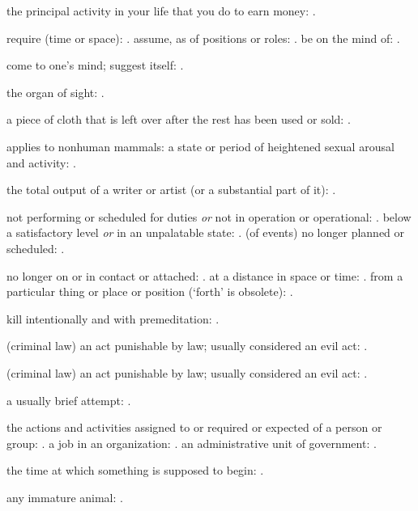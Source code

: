   the principal activity in your life that you do to earn money: .

  require (time or space): . assume, as of positions or roles: . be on the mind of: .

  come to one's mind; suggest itself: .

  the organ of sight: .

  a piece of cloth that is left over after the rest has been used or sold: .

  applies to nonhuman mammals: a state or period of heightened sexual arousal and activity: .

  the total output of a writer or artist (or a substantial part of it): .

  not performing or scheduled for duties \textit{or} not in operation or operational: . below a satisfactory level \textit{or} in an unpalatable state: . (of events) no longer planned or scheduled: .

  no longer on or in contact or attached: . at a distance in space or time: . from a particular thing or place or position (`forth' is obsolete): .

  kill intentionally and with premeditation: .

  (criminal law) an act punishable by law; usually considered an evil act: .

  (criminal law) an act punishable by law; usually considered an evil act: .

  a usually brief attempt: .

  the actions and activities assigned to or required or expected of a person or group: . a job in an organization: . an administrative unit of government: .

  the time at which something is supposed to begin: .

  any immature animal: .

